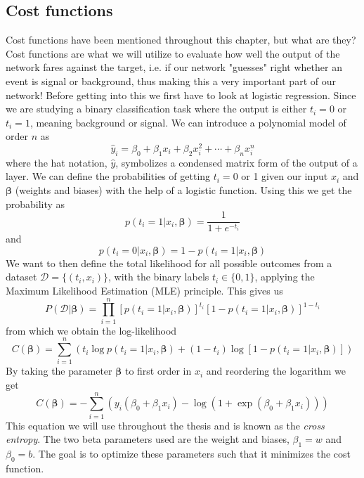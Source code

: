 \documentclass[12pt, a4paper]{book}
\begin{document}
\subsection{Cost functions}\label{sec:cost_func}
Cost functions have been mentioned throughout this chapter, but what are they? Cost functions are what we will utilize to evaluate how well the output of the network fares against the target, i.e. if our network "guesses" right whether an event is signal or background, 
thus making this a very important part of our network! Before getting into this we first have to look at logistic regression. Since we are studying a binary classification task where the output is either $t_i=0$ or $t_i = 1$, meaning background or signal. 
We can introduce a polynomial model of order $n$ as
$$
\hat{y}_i=\beta_0+\beta_1x_i+\beta_2x_i^2+\cdots+\beta_nx_i^n
$$
where the hat notation, $\hat y$, symbolizes a condensed matrix form of the output of a layer. We can define the probabilities of getting $t_i=0$ or 1 given our input $x_i$ and $\bm{\beta}$ (weights and biases) with the help of a logistic function. 
Using this we get the probability as
$$
p(t_i=1\vert x_i,\bm{\beta})=\frac{1}{1+e^{-t_i}}
$$
and
$$
p(t_i=0\vert x_i,\bm{\beta})=1- p(t_i=1\vert x_i,\bm{\beta})
$$
We want to then define the total likelihood for all possible outcomes from a dataset $\mathcal{D}=\{(t_i,x_i)\}$, with the binary labels $t_i\in\{0,1\}$, applying the Maximum Likelihood Estimation (MLE) principle. 
This gives us
$$
P(\mathcal{D}\vert\bm{\beta})=\prod_{i=1}^n\left[p(t_i=1\vert x_i,\bm{\beta})\right]^{t_i}\left[1-p(t_i=1\vert x_i,\bm{\beta})\right]^{1-t_i}
$$
from which we obtain the log-likelihood
$$
C(\bm{\beta})=\sum_{i=1}^n\left(t_i\log p(t_i=1\vert x_i,\bm{\beta})+(1-t_i)\log[1-p(t_i=1\vert x_i,\bm{\beta})]\right)
$$
By taking the parameter $\bm{\beta}$ to first order in $x_i$ and reordering the logarithm we get
\begin{equation}\label{eq:CrossEntropy}
    C(\bm{\beta})=-\sum_{i=1}^n(y_i(\beta_0+\beta_1x_i)-\log(1+\exp(\beta_0+\beta_1x_i)))
\end{equation}
This equation we will use throughout the thesis and is known as the \textit{cross entropy}. The two beta parameters used are the weight and biases, $\beta_1 = w$ and $\beta_0 = b$. The goal is to optimize these parameters such that it minimizes the cost function. 
\end{document}
